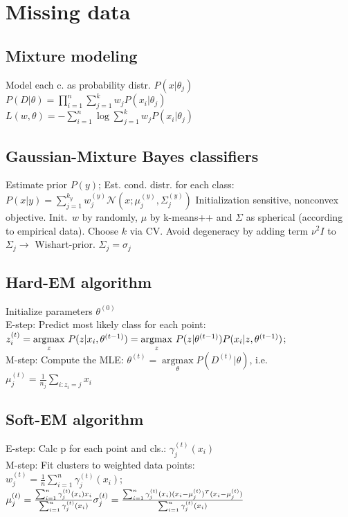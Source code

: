 \section*{Missing data}
\subsection*{Mixture modeling}
\noindent Model each c. as probability distr. $P(x|\theta_j)$\\
$P(D|\theta) = \prod_{i=1}^n \sum_{j=1}^k w_j P(x_i|\theta_j)$\\
$L(w, \theta) = - \sum_{i=1}^n \operatorname{log}  \sum_{j=1}^k w_j P(x_i| \theta_j)$

\subsection*{Gaussian-Mixture Bayes classifiers}
\noindent Estimate prior $P(y)$; Est. cond. distr. for each class:
$P(x|y) = \sum_{j=1}^{k_y} w_j^{(y)} \mathcal{N}(x; \mu_j^{(y)}, \Sigma_j^{(y)})$
Initialization sensitive, nonconvex objective. Init.\ $w$ by
randomly, $\mu$ by k-means++ and $\Sigma$ as spherical (according to empirical
data). Choose $k$ via CV.
Avoid degeneracy by adding term $\nu^2 I$ to $\Sigma_j
\rightarrow$ Wishart-prior. $\Sigma_j = \sigma_j$


\subsection*{Hard-EM algorithm}
\noindent Initialize parameters $\theta^{(0)}$\\
E-step: Predict most likely class for each point:
$z_i^{(t)} = \underset{z}{\operatorname{argmax}} ~ P(z|x_i, \theta^{(t-1)})\\
= \underset{z}{\operatorname{argmax}} ~ P(z|\theta^{(t-1)}) P(x_i|z,\theta^{(t-1)})$;\\
M-step: Compute the MLE: $\theta^{(t)} = \underset{\theta}{\operatorname{argmax}} P(D^{(t)}|\theta)$, i.e. $\mu_j^{(t)} = \frac{1}{n_j} \sum_{i: z_i = j} x_i$

\subsection*{Soft-EM algorithm}
\noindent E-step: Calc p for each point and cls.: $\gamma_j^{(t)}(x_i)$\\
M-step: Fit clusters to weighted data points:\\
$w_j^{(t)} = \frac{1}{n} \sum_{i=1}^n \gamma_j^{(t)} (x_i)$; 
$\mu_j^{(t)} = \frac{\sum_{i=1}^n \gamma_j^{(t)} (x_i) x_i}{\sum_{i=1}^n \gamma_j^{(t)} (x_i)}\\ %
\sigma_j^{(t)} = \frac{\sum_{i=1}^n \gamma_j^{(t)}(x_i) (x_i - \mu_j^{(t)})^T (x_i - \mu_j^{(t)})}{\sum_{i=1}^n \gamma_j^{(t)}(x_i)}$

